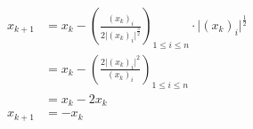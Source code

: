\documentclass[3p, twocolumn]{elsarticle}
\begin{document}
\begin{appendices}
    \begin{align*}
        x_{k+1} & = x_k - \left(\frac{(x_k)_i}{2\lvert (x_k)_i\rvert^{\frac32}}\right)_{1\leq i\leq n}\cdot \lvert (x_k)_i\vert ^{\frac12} \\
                & = x_k - \left(\frac{2\lvert (x_k)_i \rvert^{2}}{(x_k)_i}\right)_{1\leq i\leq n}                                          \\
                & = x_k - 2x_k                                                                                                             \\
        x_{k+1} & = - x_k
    \end{align*}
\end{appendices}

\nocite{*}

{\footnotesize
}
{}
\end{document}
